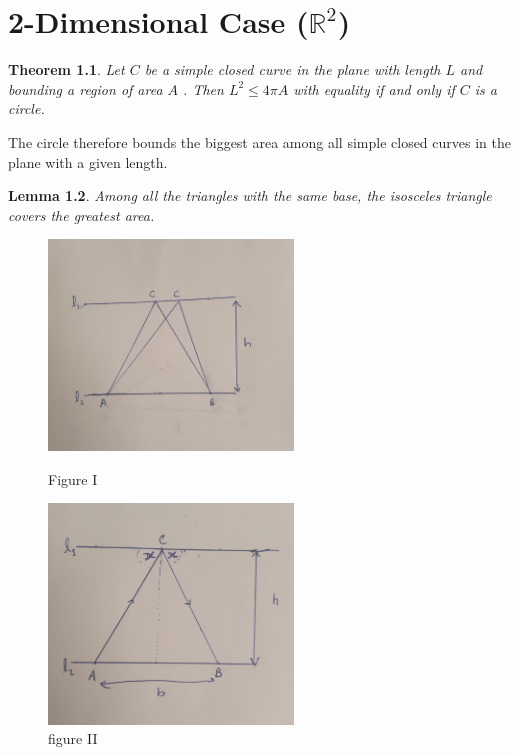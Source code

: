 \documentclass[a4paper]{book}
\newtheorem{theorem}{Theorem}%
\newtheorem{lemma}[theorem]{Lemma}%
\begin{document}
\chapter{2-Dimensional Case ($\mathbb{R}^2$)}
\begin{theorem}
    Let $C$ be a simple closed curve in the plane with length $L$ and bounding a region of area $A$ . 
    Then $L^2 \leq 4\pi A$ with equality if and only if $C$ is a circle.
\end{theorem}
The circle therefore bounds the biggest area among all simple closed curves in the plane with a given length.
\newline
\begin{lemma} 
    Among all the triangles with the same base, the isosceles triangle covers the greatest area.
\end{lemma}
\begin{figure}[h]
    \centering
    \begin{minipage}{0.5\textwidth}
        \centering
        \includegraphics[width=65mm]{isofig5.png} %
        \caption{Figure I}
    \end{minipage}\hfill
    \begin{minipage}{0.5\textwidth}
        \centering
        \includegraphics[width=65mm]{isofig6.png} %
        \caption{figure II}
    \end{minipage}
\end{figure}
\end{document}
